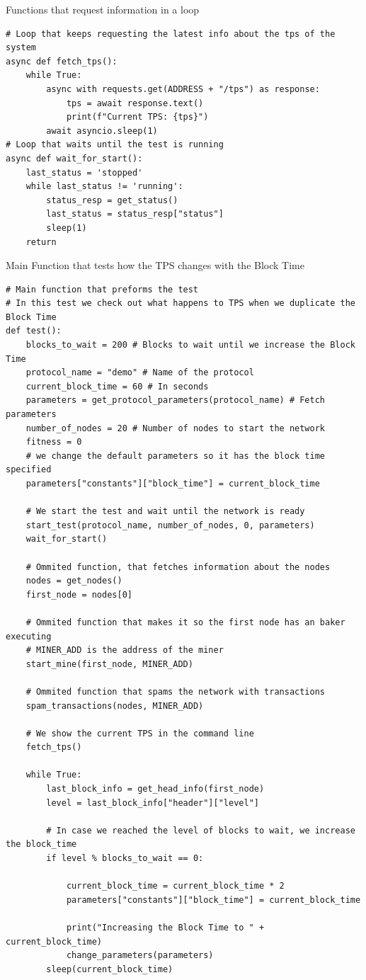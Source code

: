 \begin{listing}[H]
\caption{Functions that request information in a loop}
\label{lst:python_code}
\begin{verbatim}
# Loop that keeps requesting the latest info about the tps of the system
async def fetch_tps():
    while True:
        async with requests.get(ADDRESS + "/tps") as response:
            tps = await response.text()
            print(f"Current TPS: {tps}")
        await asyncio.sleep(1)
# Loop that waits until the test is running
async def wait_for_start():
    last_status = 'stopped'
    while last_status != 'running':
        status_resp = get_status()
        last_status = status_resp["status"]
        sleep(1)
    return
\end{verbatim}
\end{listing}

\begin{listing}[H]
\caption{Main Function that tests how the TPS changes with the Block Time}
\label{lst:python_code}
\begin{verbatim}
# Main function that preforms the test
# In this test we check out what happens to TPS when we duplicate the Block Time
def test():
    blocks_to_wait = 200 # Blocks to wait until we increase the Block Time
    protocol_name = "demo" # Name of the protocol
    current_block_time = 60 # In seconds
    parameters = get_protocol_parameters(protocol_name) # Fetch parameters 
    number_of_nodes = 20 # Number of nodes to start the network
    fitness = 0 
    # we change the default parameters so it has the block time specified
    parameters["constants"]["block_time"] = current_block_time

    # We start the test and wait until the network is ready
    start_test(protocol_name, number_of_nodes, 0, parameters)
    wait_for_start()

    # Ommited function, that fetches information about the nodes
    nodes = get_nodes()
    first_node = nodes[0] 

    # Ommited function that makes it so the first node has an baker executing
    # MINER_ADD is the address of the miner
    start_mine(first_node, MINER_ADD)

    # Ommited function that spams the network with transactions
    spam_transactions(nodes, MINER_ADD)

    # We show the current TPS in the command line
    fetch_tps()

    while True:
        last_block_info = get_head_info(first_node)
        level = last_block_info["header"]["level"]
        
        # In case we reached the level of blocks to wait, we increase the block_time
        if level % blocks_to_wait == 0:

            current_block_time = current_block_time * 2
            parameters["constants"]["block_time"] = current_block_time

            print("Increasing the Block Time to " + current_block_time)
            change_parameters(parameters)
        sleep(current_block_time)
\end{verbatim}
\end{listing}


